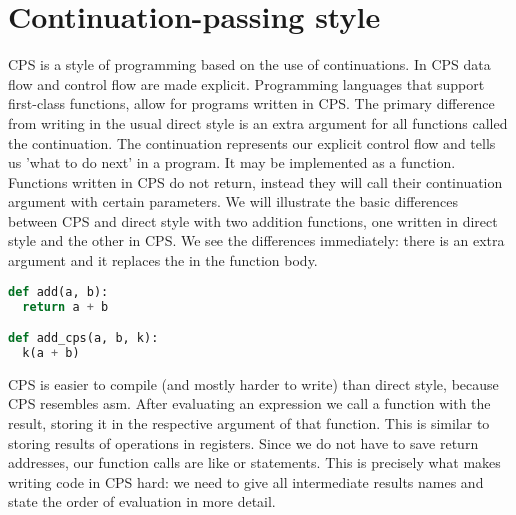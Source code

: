 
\chapter{\label{chap:cps}Continuation-passing style}
\ac{CPS}\autocite{steel1975scheme} is a style of programming based on the use of continuations. In \ac{CPS} data flow and control flow are made explicit. Programming languages that support first-class functions, allow for programs written in \ac{CPS}. The primary difference from writing in the usual direct style is an extra argument for all functions called the continuation. The continuation represents our explicit control flow and tells us 'what to do next' in a program. It may be implemented as a function. Functions written in \ac{CPS} do not return, instead they will call their continuation argument with certain parameters. We will illustrate the basic differences between \ac{CPS} and direct style with two addition functions, one written in direct style and the other in \ac{CPS}. We see the differences immediately: there is an extra argument  and it replaces the  in the function body.

\begin{lstlisting}[language=Python]
def add(a, b):
  return a + b

def add_cps(a, b, k):   
  k(a + b)           
\end{lstlisting}


\ac{CPS} is easier to compile (and mostly harder to write) than direct style, because \ac{CPS} resembles \ac{asm}. After evaluating an expression we call a function with the result, storing it in the respective argument of that function. This is similar to storing results of operations in registers. Since we do not have to save return addresses, our function calls are like  or  statements. This is precisely what makes writing code in \ac{CPS} hard: we need to give all intermediate results names and state the order of evaluation in more detail.


